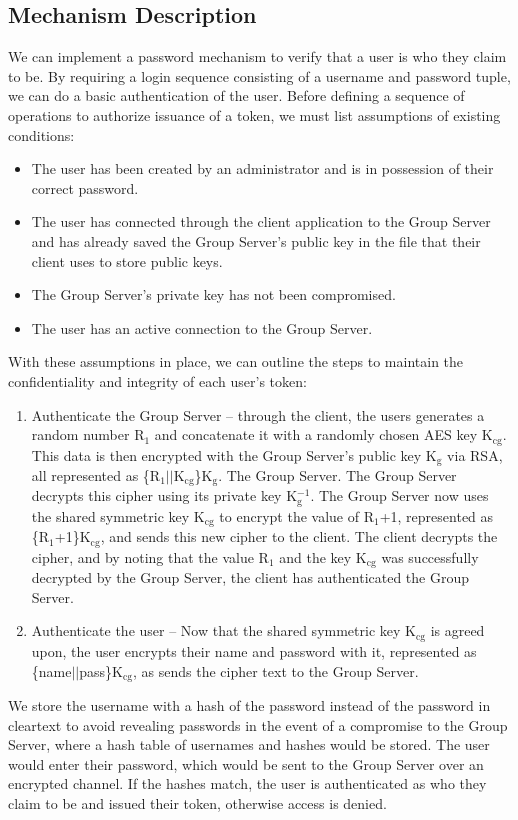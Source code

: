 \documentclass[11pt]{article}
\begin{document}
\subsection{Mechanism Description}
We can implement a password mechanism to verify that a user is who they claim to be. By requiring a login sequence consisting of a username and password tuple, we can do a basic authentication of the user. Before defining a sequence of operations to authorize issuance of a token, we must list assumptions of existing conditions:
\begin{itemize}
\item{}The user has been created by an administrator and is in possession of their correct password.
\item{}The user has connected through the client application to the Group Server and has already saved the Group Server's public key in the file that their client uses to store public keys.
\item{}The Group Server's private key has not been compromised.
\item{}The user has an active connection to the Group Server.
\end{itemize}
With these assumptions in place, we can outline the steps to maintain the confidentiality and integrity of each user's token:
\begin{enumerate}
\item{}Authenticate the Group Server -- through the client, the users generates a random number R$_1$ and concatenate it with a randomly chosen AES key K$_{\text{cg}}$. This data is then encrypted with the Group Server's public key K$_\text{g}$ via RSA, all represented as \{R$_1||$K$_{\text{cg}}$\}K$_\text{g}$. The Group Server. The Group Server decrypts this cipher using its private key K$_\text{g}^{-1}$. The Group Server now uses the shared symmetric key K$_{\text{cg}}$ to encrypt the value of R$_1$+1, represented as \{R$_1$+1\}K$_{\text{cg}}$, and sends this new cipher to the client. The client decrypts the cipher, and by noting that the value R$_1$ and the key K$_\text{cg}$ was successfully decrypted by the Group Server, the client has authenticated the Group Server.
\item{}Authenticate the user -- Now that  the shared symmetric key K$_\text{cg}$ is agreed upon, the user encrypts their name and password with it, represented as \{name$||$pass\}K$_\text{cg}$, as sends the cipher text to the Group Server.
\end{enumerate}
We store the username with a hash of the password instead of the password in cleartext to avoid revealing passwords in the event of a compromise to the Group Server, where a hash table of usernames and hashes would be stored. The user would enter their password, which would be sent to the Group Server over an encrypted channel. If the hashes match, the user is authenticated as who they claim to be and issued their token, otherwise access is denied.
\end{document}
